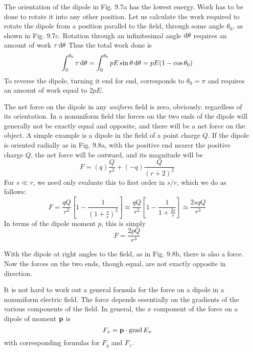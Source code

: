 
The orientation of the dipole in Fig. 9.7a has the lowest energy.
Work has to be done to rotate it into any other position. Let us calculate
the work required to rotate the dipole from a position parallel
to the field, through some angle $\theta_0$, as shown in Fig. 9.7c. Rotation
through an infinitesimal angle $\operatorname{d\!}\theta$ requires an amount of work $\tau\operatorname{d\!}\theta$
Thus the total work done is
\begin{equation}
  \int_0^{\theta_0} \tau\operatorname{d\!}\theta 
    = \int_0^{\theta_0} pE\sin\theta\operatorname{d\!}\theta
    = pE(1-\cos\theta_0)
\end{equation}
To reverse the dipole, turning it end for end, corresponds to $\theta_0=\pi$
and requires an amount of work equal to $2pE$.

The net force on the dipole in any \emph{uniform} field is zero, obviously.
regardless of its orientation. In a nonuniform field the forces on the
two ends of the dipole will generally not be exactly equal and 
opposite, and there will be a net force on the object. A simple example
is a dipole in the field of a point charge $Q$. If the dipole is oriented
radially as in Fig. 9.8a, with the positive end nearer the positive
charge $Q$, the net force will be outward, and its magnitude will be
\begin{equation}
  F = (q)\frac{Q}{r^2}+(-q)\frac{Q}{(r+2)^2}
\end{equation}
For $s\ll r$, we need only evaluate this to first order in $s/r$, which we
do as follows:
\begin{equation}
  F = \frac{qQ}{r^2}\left[1-\frac{1}{\left(1+\frac{s}{r}\right)^2}\right]
    \approx \frac{qQ}{r^2}\left[1-\frac{1}{1+\frac{2s}{r}}\right]
    \approx \frac{2sqQ}{r^3}
\end{equation}
In terms of the dipole moment $p$, this is simply
\begin{equation}
  F = \frac{2pQ}{r^3}
\end{equation}

With the dipole at right angles to the field, as in Fig. 9.8b, there is
also a force. Now the forces on the two ends, though equal, are not
exactly opposite in direction.

It is not hard to work out a general formula for the force on a dipole
in a nonuniform electric field. The force depends essentially on the
gradients of the various components of the field. In general, the
$x$ component of the force on a dipole of moment $\mathbf{p}$ is
\begin{equation}
  F_x = \mathbf{p}\cdot\operatorname{grad} E_x
\end{equation}
with corresponding formulas for $F_y$ and $F_z$.

